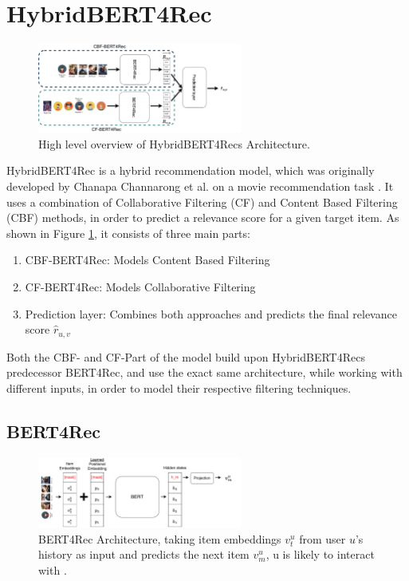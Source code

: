 \documentclass{Academic}
\begin{document}
    \section{HybridBERT4Rec}
        \begin{figure}[ht!]
            \centering
            \includegraphics[width=0.6\textwidth]{images/hybridBERT4Rec_high_level.pdf}
            \caption{High level overview of HybridBERT4Recs Architecture. \cite{channarongHybridBERT4RecHybridContentBased2022}}
            \label{fig:highlevel}
        \end{figure}
        HybridBERT4Rec is a hybrid recommendation model, which was originally developed by Chanapa Channarong et al. \cite{channarongHybridBERT4RecHybridContentBased2022} on a movie recommendation task \cite{channarongHybridBERT4RecHybridContentBased2022}. It uses a combination of Collaborative Filtering (CF) and Content Based Filtering (CBF) methods, in order to predict a relevance score for a given target item.
        As shown in Figure \ref{fig:highlevel}, it consists of three main parts:
        \begin{enumerate}
            \item CBF-BERT4Rec: Models Content Based Filtering
            \item CF-BERT4Rec: Models Collaborative Filtering
            \item Prediction layer: Combines both approaches and predicts the final relevance score $\hat{r}_{u,v}$
        \end{enumerate}
        Both the CBF- and CF-Part of the model build upon HybridBERT4Recs predecessor BERT4Rec, and use the exact same architecture, while working with different inputs, in order to model their respective filtering techniques.

        \subsection{BERT4Rec}
        \begin{figure}[ht!]
            \centering
            \includegraphics[width=0.6\textwidth]{images/BERT4Rec.pdf}
            \caption{BERT4Rec Architecture, taking item embeddings $v_t^u$ from user $u$'s history as input and predicts the next item $v_m^u$, u is likely to interact with \cite{sunBERT4RecSequentialRecommendation2019}.}
            \label{fig:bert4rec}
        \end{figure}
\end{document}
